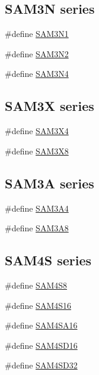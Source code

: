 \subsection*{S\-A\-M3\-N series}
\begin{DoxyCompactItemize}
\item 
\#define \hyperlink{group__sam__part__macros__group_gaf58a7d141f31d6db97223dfd62d92905}{S\-A\-M3\-N1}
\item 
\#define \hyperlink{group__sam__part__macros__group_ga96514eddac4935925994ef85ca9d12ac}{S\-A\-M3\-N2}
\item 
\#define \hyperlink{group__sam__part__macros__group_ga1d47bffd90ddbb0dac3874edbafb3803}{S\-A\-M3\-N4}
\end{DoxyCompactItemize}
\subsection*{S\-A\-M3\-X series}
\begin{DoxyCompactItemize}
\item 
\#define \hyperlink{group__sam__part__macros__group_ga735357bdbbd05356a7829e517fb4203f}{S\-A\-M3\-X4}
\item 
\#define \hyperlink{group__sam__part__macros__group_ga13be8353e38999aaca5c412c895c15da}{S\-A\-M3\-X8}
\end{DoxyCompactItemize}
\subsection*{S\-A\-M3\-A series}
\begin{DoxyCompactItemize}
\item 
\#define \hyperlink{group__sam__part__macros__group_ga1f4481b0cd1b2c1a4636999b6a433b9f}{S\-A\-M3\-A4}
\item 
\#define \hyperlink{group__sam__part__macros__group_gab1397a5e346af96e5ed34027ed3b4de8}{S\-A\-M3\-A8}
\end{DoxyCompactItemize}
\subsection*{S\-A\-M4\-S series}
\begin{DoxyCompactItemize}
\item 
\#define \hyperlink{group__sam__part__macros__group_ga04e32c037894a537ffb6193413693cb0}{S\-A\-M4\-S8}
\item 
\#define \hyperlink{group__sam__part__macros__group_ga1c3c5c80f2c2ca26604ff5d59cb3a0b2}{S\-A\-M4\-S16}
\item 
\#define \hyperlink{group__sam__part__macros__group_ga51a0ff030b5d9e555653a4227538a888}{S\-A\-M4\-S\-A16}
\item 
\#define \hyperlink{group__sam__part__macros__group_ga817106c645da5be09dd37af37d7fb805}{S\-A\-M4\-S\-D16}
\item 
\#define \hyperlink{group__sam__part__macros__group_gaddfc17b115c4d5b5ff8b14eb2b8d4a2a}{S\-A\-M4\-S\-D32}
\end{DoxyCompactItemize}
